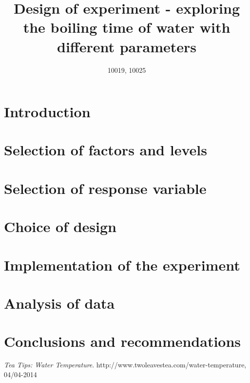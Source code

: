 \documentclass[10pt,a4paper]{article}
\begin{document}
\title{Design of experiment - exploring the boiling time of water with different parameters}
\author{10019, 10025}
\maketitle

\section{Introduction}


\section{Selection of factors and levels}


\section{Selection of response variable}


\section{Choice of design}


\section{Implementation of the experiment}


\section{Analysis of data}


\section{Conclusions and recommendations}


\begin{thebibliography}{9}
  \emph{Tea Tips: Water Temperature}.
  http://www.twoleavestea.com/water-temperature, 04/04-2014
\end{thebibliography}
\end{document}
